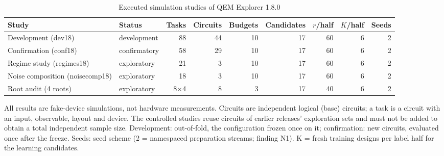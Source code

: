 \begin{table}[p]
\centering
\footnotesize
\setlength{\tabcolsep}{3.0pt}
\caption{Executed simulation studies of QEM Explorer 1.8.0}
\label{tab:qem180-studies}
\begin{tabular}{llrrrrrrr}
\toprule
Study & Status & Tasks & Circuits & Budgets & Candidates & $r$/half & $K$/half & Seeds \\
\midrule
Development (dev18) & development & 88 & 44 & 10 & 17 & 60 & 6 & 2 \\
Confirmation (conf18) & confirmatory & 58 & 29 & 10 & 17 & 60 & 6 & 2 \\
Regime study (regimes18) & exploratory & 21 & 3 & 10 & 17 & 60 & 6 & 2 \\
Noise composition (noisecomp18) & exploratory & 18 & 3 & 10 & 17 & 60 & 6 & 2 \\
Root audit (4 roots) & exploratory & 8$\times$4 & 8 & 3 & 17 & 40 & 6 & 2 \\
\bottomrule
\end{tabular}
\par\vspace{0.5em}
\begin{minipage}{0.97\linewidth}
\footnotesize All results are fake-device simulations, not hardware measurements. Circuits are independent logical (base) circuits; a task is a circuit with an input, observable, layout and device. The controlled studies reuse circuits of earlier releases' exploration sets and must not be added to obtain a total independent sample size. Development: out-of-fold, the configuration frozen once on it; confirmation: new circuits, evaluated once after the freeze. Seeds: seed scheme (2 = namespaced preparation streams; finding N1). K = fresh training designs per label half for the learning candidates.
\end{minipage}
\end{table}
